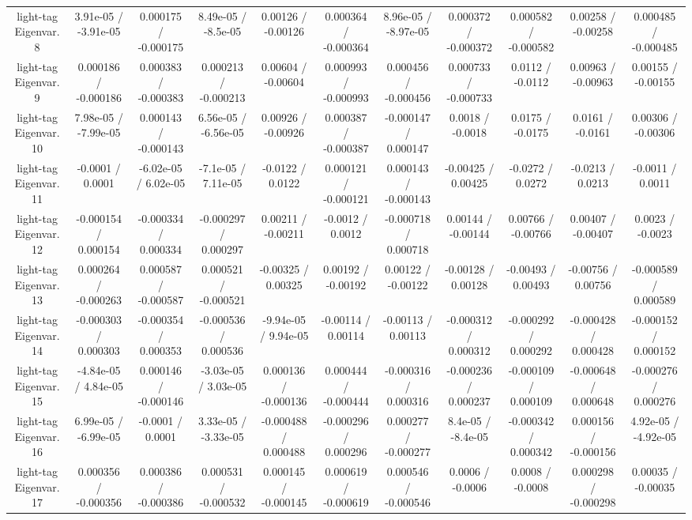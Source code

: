 \begin{table}[htbp]
\begin{center}
\begin{tabular}{|c|c|c|c|c|c|c|c|c|c|c|}
  light-tag Eigenvar. 8 & 3.91e-05 / -3.91e-05 & 0.000175 / -0.000175 & 8.49e-05 / -8.5e-05 & 0.00126 / -0.00126 & 0.000364 / -0.000364 & 8.96e-05 / -8.97e-05 & 0.000372 / -0.000372 & 0.000582 / -0.000582 & 0.00258 / -0.00258 & 0.000485 / -0.000485 \\ 
  light-tag Eigenvar. 9 & 0.000186 / -0.000186 & 0.000383 / -0.000383 & 0.000213 / -0.000213 & 0.00604 / -0.00604 & 0.000993 / -0.000993 & 0.000456 / -0.000456 & 0.000733 / -0.000733 & 0.0112 / -0.0112 & 0.00963 / -0.00963 & 0.00155 / -0.00155 \\ 
  light-tag Eigenvar. 10 & 7.98e-05 / -7.99e-05 & 0.000143 / -0.000143 & 6.56e-05 / -6.56e-05 & 0.00926 / -0.00926 & 0.000387 / -0.000387 & -0.000147 / 0.000147 & 0.0018 / -0.0018 & 0.0175 / -0.0175 & 0.0161 / -0.0161 & 0.00306 / -0.00306 \\ 
  light-tag Eigenvar. 11 & -0.0001 / 0.0001 & -6.02e-05 / 6.02e-05 & -7.1e-05 / 7.11e-05 & -0.0122 / 0.0122 & 0.000121 / -0.000121 & 0.000143 / -0.000143 & -0.00425 / 0.00425 & -0.0272 / 0.0272 & -0.0213 / 0.0213 & -0.0011 / 0.0011 \\ 
  light-tag Eigenvar. 12 & -0.000154 / 0.000154 & -0.000334 / 0.000334 & -0.000297 / 0.000297 & 0.00211 / -0.00211 & -0.0012 / 0.0012 & -0.000718 / 0.000718 & 0.00144 / -0.00144 & 0.00766 / -0.00766 & 0.00407 / -0.00407 & 0.0023 / -0.0023 \\ 
  light-tag Eigenvar. 13 & 0.000264 / -0.000263 & 0.000587 / -0.000587 & 0.000521 / -0.000521 & -0.00325 / 0.00325 & 0.00192 / -0.00192 & 0.00122 / -0.00122 & -0.00128 / 0.00128 & -0.00493 / 0.00493 & -0.00756 / 0.00756 & -0.000589 / 0.000589 \\ 
  light-tag Eigenvar. 14 & -0.000303 / 0.000303 & -0.000354 / 0.000353 & -0.000536 / 0.000536 & -9.94e-05 / 9.94e-05 & -0.00114 / 0.00114 & -0.00113 / 0.00113 & -0.000312 / 0.000312 & -0.000292 / 0.000292 & -0.000428 / 0.000428 & -0.000152 / 0.000152 \\ 
  light-tag Eigenvar. 15 & -4.84e-05 / 4.84e-05 & 0.000146 / -0.000146 & -3.03e-05 / 3.03e-05 & 0.000136 / -0.000136 & 0.000444 / -0.000444 & -0.000316 / 0.000316 & -0.000236 / 0.000237 & -0.000109 / 0.000109 & -0.000648 / 0.000648 & -0.000276 / 0.000276 \\ 
  light-tag Eigenvar. 16 & 6.99e-05 / -6.99e-05 & -0.0001 / 0.0001 & 3.33e-05 / -3.33e-05 & -0.000488 / 0.000488 & -0.000296 / 0.000296 & 0.000277 / -0.000277 & 8.4e-05 / -8.4e-05 & -0.000342 / 0.000342 & 0.000156 / -0.000156 & 4.92e-05 / -4.92e-05 \\ 
  light-tag Eigenvar. 17 & 0.000356 / -0.000356 & 0.000386 / -0.000386 & 0.000531 / -0.000532 & 0.000145 / -0.000145 & 0.000619 / -0.000619 & 0.000546 / -0.000546 & 0.0006 / -0.0006 & 0.0008 / -0.0008 & 0.000298 / -0.000298 & 0.00035 / -0.00035 \\ 

\end{tabular}
\end{center}
\end{table}
